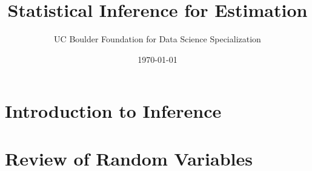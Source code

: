 \documentclass[12pt]{article}
\title{\textbf{Statistical Inference for Estimation}}
\author{UC Boulder Foundation for Data Science Specialization}
\date{\today}
\begin{document}
\maketitle
\tableofcontents
\newpage

\section{Introduction to Inference}


\section{Review of Random Variables}

\end{document}
